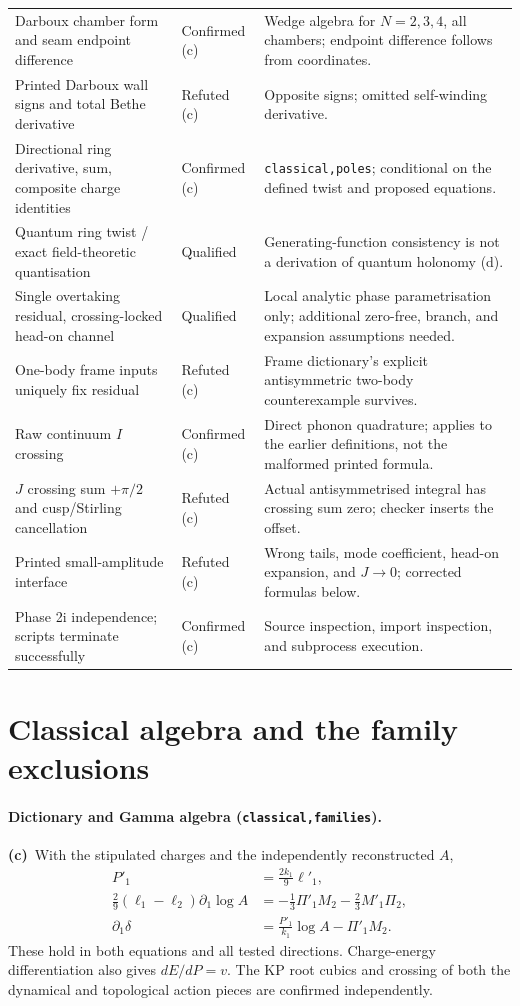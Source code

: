 \documentclass[11pt,a4paper]{article}
\newcommand{\Lc}{\textbf{(c)}\ }
\begin{document}
\begin{longtable}{@{}L{5.0cm}L{2.1cm}L{8.0cm}@{}}
Darboux chamber form and seam endpoint difference & Confirmed (c) & Wedge algebra for $N=2,3,4$, all chambers; endpoint difference follows from coordinates.\\
Printed Darboux wall signs and total Bethe derivative & Refuted (c) & Opposite signs; omitted self-winding derivative.\\
Directional ring derivative, sum, composite charge identities & Confirmed (c) & \texttt{classical,poles}; conditional on the defined twist and proposed equations.\\
Quantum ring twist / exact field-theoretic quantisation & Qualified & Generating-function consistency is not a derivation of quantum holonomy (d).\\
Single overtaking residual, crossing-locked head-on channel & Qualified & Local analytic phase parametrisation only; additional zero-free, branch, and expansion assumptions needed.\\
One-body frame inputs uniquely fix residual & Refuted (c) & Frame dictionary's explicit antisymmetric two-body counterexample survives.\\
Raw continuum $I$ crossing & Confirmed (c) & Direct phonon quadrature; applies to the earlier definitions, not the malformed printed formula.\\
$J$ crossing sum $+\pi/2$ and cusp/Stirling cancellation & Refuted (c) & Actual antisymmetrised integral has crossing sum zero; checker inserts the offset.\\
Printed small-amplitude interface & Refuted (c) & Wrong tails, mode coefficient, head-on expansion, and $J\to0$; corrected formulas below.\\
Phase 2i independence; scripts terminate successfully & Confirmed (c) & Source inspection, import inspection, and subprocess execution.\\
\bottomrule
\end{longtable}
\normalsize

\section{Classical algebra and the family exclusions}
\paragraph{Dictionary and Gamma algebra (\texttt{classical,families}).}
\Lc With the stipulated charges and the independently reconstructed $A$,
\begin{align}
 P'_1&=\frac{2k_1}{9}\ell'_1,\\
 \frac29(\ell_1-\ell_2)\partial_1\log A
 &=-\frac13\Pi'_1M_2-\frac23M'_1\Pi_2,\\
 \partial_1\delta&=\frac{P'_1}{k_1}\log A-\Pi'_1M_2.
 \label{eq:derivative}
\end{align}
These hold in both equations and all tested directions. Charge-energy
differentiation also gives $dE/dP=v$. The KP root cubics and crossing of both
the dynamical and topological action pieces are confirmed independently.
\end{document}
